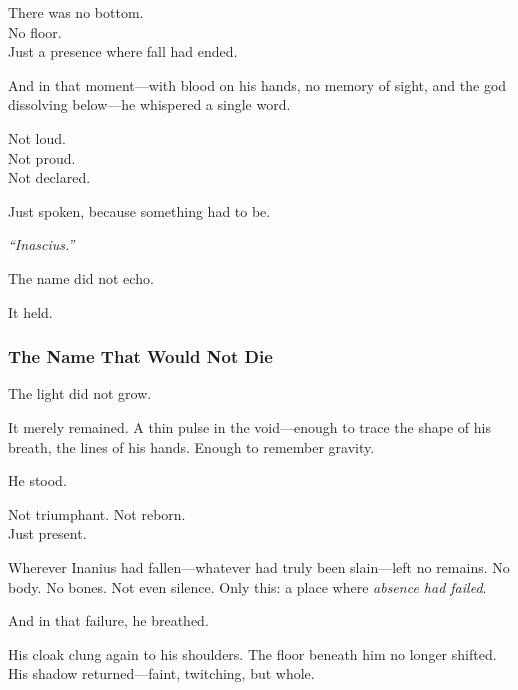 \documentclass[12pt]{article}
\begin{document}
\vspace{0.5em}
There was no bottom.\\
No floor.\\
Just a presence where fall had ended.

\vspace{0.5em}
And in that moment---with blood on his hands, no memory of sight, and the god dissolving below---he whispered a single word.

\vspace{0.5em}
Not loud.\\
Not proud.\\
Not declared.

\vspace{0.5em}
Just spoken, because something had to be.

\vspace{0.5em}
\textit{``Inascius.''}

\vspace{0.5em}
The name did not echo.

\vspace{0.5em}
It held.

\dotfill

\subsubsection*{The Name That Would Not Die}

The light did not grow.

\vspace{0.5em}
It merely remained. A thin pulse in the void---enough to trace the shape of his breath, the lines of his hands. Enough to remember gravity.

\vspace{0.5em}
He stood.

\vspace{0.5em}
Not triumphant. Not reborn.\\
Just present.

\vspace{0.5em}
Wherever Inanius had fallen---whatever had truly been slain---left no remains. No body. No bones. Not even silence. Only this: a place where \textit{absence had failed}.

\vspace{0.5em}
And in that failure, he breathed.

\vspace{0.5em}
His cloak clung again to his shoulders. The floor beneath him no longer shifted. His shadow returned---faint, twitching, but whole.
\end{document}
